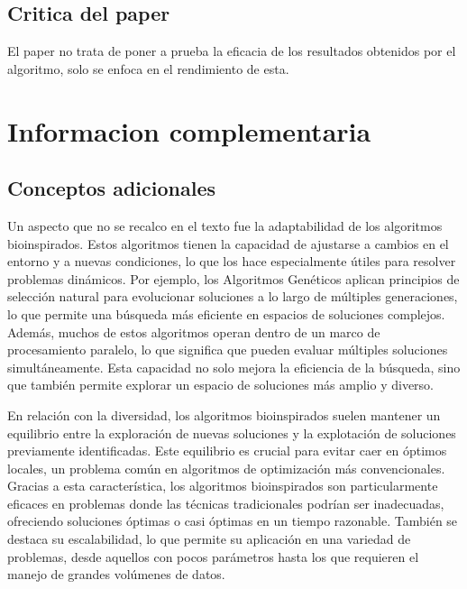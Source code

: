 \subsection{Critica del paper} %
El paper no trata de poner a prueba la eficacia de los resultados obtenidos por
el algoritmo, solo se enfoca en el rendimiento de esta.

\section{Informacion complementaria} %

\subsection{Conceptos adicionales} %
Un aspecto que no se recalco en el texto fue la adaptabilidad de los algoritmos
bioinspirados. Estos algoritmos tienen la capacidad de ajustarse a
cambios en el entorno y a nuevas condiciones, lo que los hace especialmente
útiles para resolver problemas dinámicos. Por ejemplo, los Algoritmos Genéticos
aplican principios de selección natural para evolucionar soluciones a lo largo
de múltiples generaciones, lo que permite una búsqueda más eficiente en
espacios de soluciones complejos. Además, muchos de estos algoritmos operan
dentro de un marco de procesamiento paralelo, lo que significa que pueden
evaluar múltiples soluciones simultáneamente. Esta capacidad no solo mejora la
eficiencia de la búsqueda, sino que también permite explorar un espacio de
soluciones más amplio y diverso.

En relación con la diversidad, los algoritmos bioinspirados suelen mantener un
equilibrio entre la exploración de nuevas soluciones y la explotación de
soluciones previamente identificadas. Este equilibrio es crucial para evitar
caer en óptimos locales, un problema común en algoritmos de optimización más
convencionales. Gracias a esta característica, los algoritmos bioinspirados son
particularmente eficaces en problemas donde las técnicas tradicionales podrían
ser inadecuadas, ofreciendo soluciones óptimas o casi óptimas en un tiempo
razonable. También se destaca su escalabilidad, lo que permite su aplicación en
una variedad de problemas, desde aquellos con pocos parámetros hasta los que
requieren el manejo de grandes volúmenes de datos.

